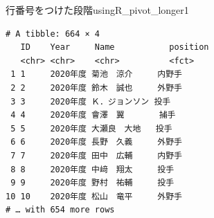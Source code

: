 \begin{Rscreen}{行番号をつけた段階}{usingR_pivot_longer1}
	\begin{verbatim}
# A tibble: 664 × 4
   ID    Year     Name           position
   <chr> <chr>    <chr>          <fct>   
 1 1     2020年度 菊池　涼介     内野手  
 2 2     2020年度 鈴木　誠也     外野手  
 3 3     2020年度 Ｋ．ジョンソン 投手    
 4 4     2020年度 會澤　翼       捕手    
 5 5     2020年度 大瀬良　大地   投手    
 6 6     2020年度 長野　久義     外野手  
 7 7     2020年度 田中　広輔     内野手  
 8 8     2020年度 中﨑　翔太     投手    
 9 9     2020年度 野村　祐輔     投手    
10 10    2020年度 松山　竜平     外野手  
# … with 654 more rows
\end{verbatim}
\end{Rscreen}
